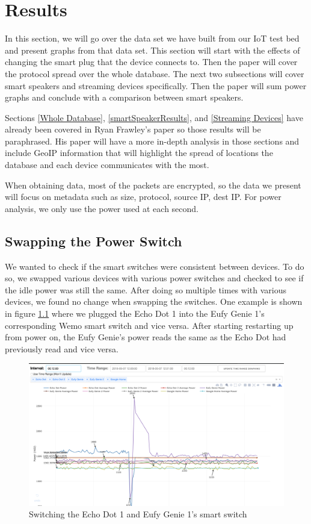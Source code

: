\chapter{Results}
\label{Results}
In this section, we will go over the data set we have built from our IoT test bed and present graphs from that data set. This section will start with the effects of changing the smart plug that the device connects to. Then the paper will cover the protocol spread over the whole database. The next two subsections will cover smart speakers and streaming devices specifically. Then the paper will sum power graphs and conclude with a comparison between smart speakers.

Sections \ref{Whole Database}, \ref{smartSpeakerResults}, and \ref{Streaming Devices} have already been covered in Ryan Frawley's paper\cite{frawley_2018} so those results will be paraphrased. His paper will have a more in-depth analysis in those sections and include GeoIP information that will highlight the spread of locations the database and each device communicates with the most.

When obtaining data, most of the packets are encrypted, so the data we present will focus on metadata such as size, protocol, source IP, dest IP. For power analysis, we only use the power used at each second.

\section{Swapping the Power Switch}
\label{swappingSwitch}
We wanted to check if the smart switches were consistent between devices. To do so, we swapped various devices with various power switches and checked to see if the idle power was still the same. After doing so multiple times with various devices, we found no change when swapping the switches. One example is shown in figure  \ref{fig:switchEchoEufyPlug} where we plugged the Echo Dot 1 into the Eufy
Genie 1's corresponding Wemo smart switch and vice versa. After starting restarting up from power on, the Eufy Genie's power reads the same as the Echo Dot had previously read and vice versa.

\begin{figure}[H]
    \centering
    \includegraphics[width=1\textwidth]{figures/switchEchoEufyPlug.png}
    \caption{Switching the Echo Dot 1 and Eufy Genie 1's smart switch}
    \label{fig:switchEchoEufyPlug}
\end{figure}

